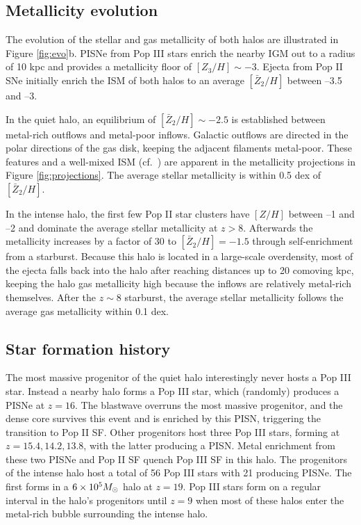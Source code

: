 \documentclass[12pt]{article}
\newcommand{\Ms}{\ifmmode{M_\odot}\else{$M_\odot$}\fi}
\begin{document}

\subsection*{Metallicity evolution}
\label{sec:zevo}

The evolution of the stellar and gas metallicity of both halos are
illustrated in Figure \ref{fig:evo}b.  PISNe from Pop III stars enrich
the nearby IGM out to a radius of 10 kpc and provides a metallicity
floor of $[Z_3/H] \sim -3$.  Ejecta from Pop II SNe initially enrich
the ISM of both halos to an average $[\bar{Z}_2/H]$ between --3.5 and
--3.

In the quiet halo, an equilibrium of $[\bar{Z}_2/H] \sim -2.5$ is
established between metal-rich outflows and metal-poor inflows.
Galactic outflows are directed in the polar directions of the gas
disk, keeping the adjacent filaments metal-poor.  These features and a
well-mixed ISM (cf.~\cite{Wise08_Gal, Greif10}) are apparent in the
metallicity projections in Figure \ref{fig:projections}.  The average
stellar metallicity is within 0.5 dex of $[\bar{Z}_2/H]$.

In the intense halo, the first few Pop II star clusters have $[Z/H]$
between --1 and --2 and dominate the average stellar metallicity at $z
> 8$.  Afterwards the metallicity increases by a factor of 30 to
$[\bar{Z}_2/H] = -1.5$ through self-enrichment from a starburst.
Because this halo is located in a large-scale overdensity, most of the
ejecta falls back into the halo after reaching distances up to 20
comoving kpc, keeping the halo gas metallicity high because the
inflows are relatively metal-rich themselves.  After the $z \sim 8$
starburst, the average stellar metallicity follows the average gas
metallicity within 0.1 dex.

\subsection*{Star formation history}
\label{sec:pop}

The most massive progenitor of the quiet halo interestingly never
hosts a Pop III star.  Instead a nearby halo forms a Pop III star,
which (randomly) produces a PISNe at $z=16$.  The blastwave overruns
the most massive progenitor, and the dense core survives this event
and is enriched by this PISN, triggering the transition to Pop II SF.
Other progenitors host three Pop III stars, forming at $z = 15.4,
14.2, 13.8$, with the latter producing a PISN.  Metal enrichment from
these two PISNe and Pop II SF quench Pop III SF in this halo.  The
progenitors of the intense halo host a total of 56 Pop III stars with
21 producing PISNe.  The first forms in a $6 \times 10^5 \Ms$ halo at
$z=19$.  Pop III stars form on a regular interval in the halo's
progenitors until $z=9$ when most of these halos enter the metal-rich
bubble surrounding the intense halo.
\end{document}
